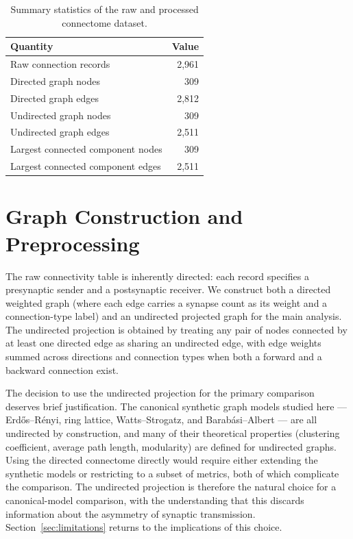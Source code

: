\documentclass[12pt,a4paper]{report}
\begin{document}
\begin{table}[H]
\centering
\caption{Summary statistics of the raw and processed connectome dataset.}
\label{tab:dataset-summary}
\begin{tabular}{lr}
\toprule
Quantity & Value \\
\midrule
Raw connection records & 2{,}961 \\
Directed graph nodes & 309 \\
Directed graph edges & 2{,}812 \\
Undirected graph nodes & 309 \\
Undirected graph edges & 2{,}511 \\
Largest connected component nodes & 309 \\
Largest connected component edges & 2{,}511 \\
\bottomrule
\end{tabular}
\end{table}

\section{Graph Construction and Preprocessing}

The raw connectivity table is inherently directed: each record specifies a presynaptic sender and a postsynaptic receiver. We construct both a directed weighted graph (where each edge carries a synapse count as its weight and a connection-type label) and an undirected projected graph for the main analysis. The undirected projection is obtained by treating any pair of nodes connected by at least one directed edge as sharing an undirected edge, with edge weights summed across directions and connection types when both a forward and a backward connection exist.

The decision to use the undirected projection for the primary comparison deserves brief justification. The canonical synthetic graph models studied here — Erd\H{o}s--R\'{e}nyi, ring lattice, Watts--Strogatz, and Barab\'{a}si--Albert — are all undirected by construction, and many of their theoretical properties (clustering coefficient, average path length, modularity) are defined for undirected graphs. Using the directed connectome directly would require either extending the synthetic models or restricting to a subset of metrics, both of which complicate the comparison. The undirected projection is therefore the natural choice for a canonical-model comparison, with the understanding that this discards information about the asymmetry of synaptic transmission. Section~\ref{sec:limitations} returns to the implications of this choice.
\end{document}

